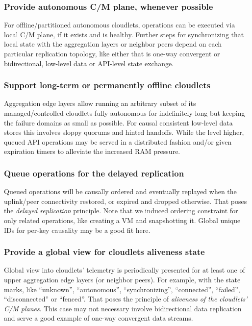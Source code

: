 \documentclass[conference]{IEEEtran}
\begin{document}
\subsubsection{Provide autonomous C/M plane, whenever possible}
For offline/partitioned autonomous cloudlets, operations can be executed via
local C/M plane, if it exists and is healthy. Further steps for synchronizing
that local state with the aggregation layers or neighbor peers depend on each
particular replication topology, like either that is one-way convergent or
bidirectional, low-level data or API-level state exchange.

\subsubsection{Support long-term or permanently offline cloudlets}
Aggregation edge layers allow running an arbitrary subset of its
managed/controlled cloudlets fully autonomous for indefinitely long but keeping
the failure domains as small as possible. For causal consistent low-level data
stores this involves sloppy quorums and hinted handoffs\cite{b17}. While the
level higher, queued API operations may be served in a distributed fashion
and/or given expiration timers to alleviate the increased RAM pressure.

\subsubsection{Queue operations for the delayed replication}
Queued operations will be causally ordered and eventually replayed when the
uplink/peer connectivity restored, or expired and dropped otherwise. That poses
the \textit{delayed replication} principle. Note that we induced ordering
constraint for only related operations, like creating a VM and snapshotting it.
Global unique IDs for per-key causality may be a good fit here.

\subsubsection{Provide a global view for cloudlets aliveness state}
Global view into cloudlets' telemetry is
periodically presented for at least one of upper aggregation edge layers (or
neighbor peers). For example, with the state marks, like ``unknown'',
``autonomous'', ``synchronizing'', ``connected'', ``failed'', ``disconnected''
or ``fenced''. That poses the principle of \textit{aliveness of the cloudlets'
C/M planes}. This case may not necessary involve bidirectional data
replication and serve a good example of one-way convergent data streams.
\end{document}
